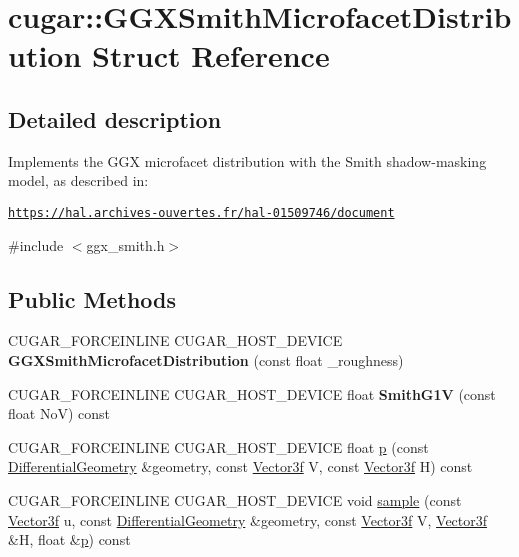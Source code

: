 \hypertarget{structcugar_1_1_g_g_x_smith_microfacet_distribution}{}\section{cugar\+:\+:G\+G\+X\+Smith\+Microfacet\+Distribution Struct Reference}
\label{structcugar_1_1_g_g_x_smith_microfacet_distribution}


\subsection{Detailed description}
Implements the G\+GX microfacet distribution with the Smith shadow-\/masking model, as described in\+:

\href{https://hal.archives-ouvertes.fr/hal-01509746/document}{\tt https\+://hal.\+archives-\/ouvertes.\+fr/hal-\/01509746/document} 

{\ttfamily \#include $<$ggx\+\_\+smith.\+h$>$}

\subsection*{Public Methods}
\begin{DoxyCompactItemize}
\item 
\mbox{\label{structcugar_1_1_g_g_x_smith_microfacet_distribution_a5f01aafd344fd8d2f700f133b4eda0d2}} 
C\+U\+G\+A\+R\+\_\+\+F\+O\+R\+C\+E\+I\+N\+L\+I\+NE C\+U\+G\+A\+R\+\_\+\+H\+O\+S\+T\+\_\+\+D\+E\+V\+I\+CE {\bfseries G\+G\+X\+Smith\+Microfacet\+Distribution} (const float \+\_\+roughness)
\item 
\mbox{\label{structcugar_1_1_g_g_x_smith_microfacet_distribution_a5c3fe2084e477686847a5235b1c15c2c}} 
C\+U\+G\+A\+R\+\_\+\+F\+O\+R\+C\+E\+I\+N\+L\+I\+NE C\+U\+G\+A\+R\+\_\+\+H\+O\+S\+T\+\_\+\+D\+E\+V\+I\+CE float {\bfseries Smith\+G1V} (const float NoV) const
\item 
C\+U\+G\+A\+R\+\_\+\+F\+O\+R\+C\+E\+I\+N\+L\+I\+NE C\+U\+G\+A\+R\+\_\+\+H\+O\+S\+T\+\_\+\+D\+E\+V\+I\+CE float \hyperlink{structcugar_1_1_g_g_x_smith_microfacet_distribution_a5ab852daebbd282ab41c8003bbf02c51}{p} (const \hyperlink{structcugar_1_1_differential_geometry}{Differential\+Geometry} \&geometry, const \hyperlink{structcugar_1_1_vector}{Vector3f} V, const \hyperlink{structcugar_1_1_vector}{Vector3f} H) const
\item 
C\+U\+G\+A\+R\+\_\+\+F\+O\+R\+C\+E\+I\+N\+L\+I\+NE C\+U\+G\+A\+R\+\_\+\+H\+O\+S\+T\+\_\+\+D\+E\+V\+I\+CE void \hyperlink{structcugar_1_1_g_g_x_smith_microfacet_distribution_ad985938cdb73621b83bd28664395dc0e}{sample} (const \hyperlink{structcugar_1_1_vector}{Vector3f} u, const \hyperlink{structcugar_1_1_differential_geometry}{Differential\+Geometry} \&geometry, const \hyperlink{structcugar_1_1_vector}{Vector3f} V, \hyperlink{structcugar_1_1_vector}{Vector3f} \&H, float \&\hyperlink{structcugar_1_1_g_g_x_smith_microfacet_distribution_a5ab852daebbd282ab41c8003bbf02c51}{p}) const
\end{DoxyCompactItemize}
